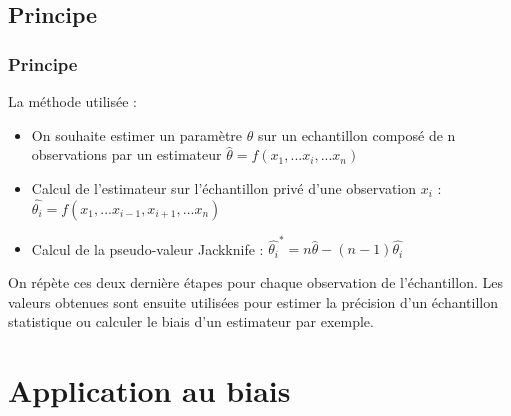 \documentclass[handout]{beamer}
\begin{document}
		\subsection{Principe}
		\begin{frame}
			\frametitle{Principe}
%
%

			La méthode utilisée :
			\begin{itemize}
				\item On souhaite estimer un paramètre $\theta$ sur un echantillon composé de n observations par un estimateur $\hat{\theta} = f(x_1,...x_i,...x_n)$
				\item Calcul de l'estimateur sur l'échantillon privé d'une observation $x_i$ : $\hat{\theta_i} = f(x_1,...x_{i-1},x_{i+1},...x_n)$
				\item Calcul de la pseudo-valeur Jackknife : $\hat{\theta_i}^* = n\hat{\theta} - (n-1) \hat{\theta_i}$
			\end{itemize}

			\vspace{15px}

			On répète ces deux dernière étapes pour chaque observation de l'échantillon. Les valeurs obtenues sont ensuite utilisées pour estimer la précision d'un échantillon statistique ou calculer le biais d'un estimateur par exemple.

%
		\end{frame}

	\section{Application au biais}

\end{document}
